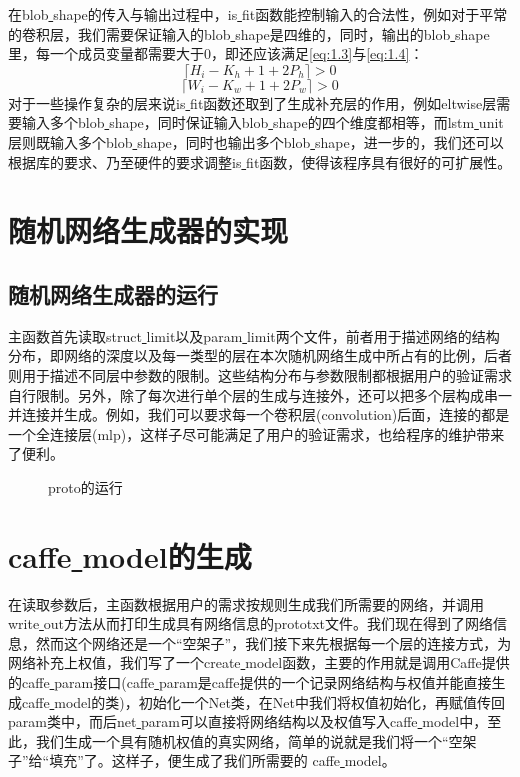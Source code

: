 在blob\underline{ }shape的传入与输出过程中，is\underline{ }fit函数能控制输入的合法性，例如对于平常的卷积层，我们需要保证输入的blob\underline{ }shape是四维的，同时，输出的blob\underline{ }shape里，每一个成员变量都需要大于0，即还应该满足\autoref{eq:1.3}与\autoref{eq:1.4}：
\begin{equation}\label{eq:1.3}
\lceil H_{i}-K_h+1+2P_{h}\rceil >0
\end{equation}
\begin{equation}\label{eq:1.4}
\lceil W_{i}-K_w+1+2P_{w}\rceil >0
\end{equation}
对于一些操作复杂的层来说is\underline{ }fit函数还取到了生成补充层的作用，例如eltwise层需要输入多个blob\underline{ }shape，同时保证输入blob\underline{ }shape的四个维度都相等，而lstm\underline{ }unit层则既输入多个blob\underline{ }shape，同时也输出多个blob\underline{ }shape，进一步的，我们还可以根据库的要求、乃至硬件的要求调整is\underline{ }fit函数，使得该程序具有很好的可扩展性。
\section{随机网络生成器的实现}
\subsection{随机网络生成器的运行}
主函数首先读取struct\underline{ }limit以及param\underline{ }limit两个文件，前者用于描述网络的结构分布，即网络的深度以及每一类型的层在本次随机网络生成中所占有的比例，后者则用于描述不同层中参数的限制。这些结构分布与参数限制都根据用户的验证需求自行限制。另外，除了每次进行单个层的生成与连接外，还可以把多个层构成串一并连接并生成。例如，我们可以要求每一个卷积层(convolution)后面，连接的都是一个全连接层(mlp)，这样子尽可能满足了用户的验证需求，也给程序的维护带来了便利。

\begin{figure}[!htbp]
\centering 
{}
\caption{proto的运行}
\label{fig:limit}
\end{figure}
\section{caffe\underline{ }model的生成}

在读取参数后，主函数根据用户的需求按规则生成我们所需要的网络，并调用write\underline{ }out方法从而打印生成具有网络信息的prototxt文件。我们现在得到了网络信息，然而这个网络还是一个“空架子”，我们接下来先根据每一个层的连接方式，为网络补充上权值，我们写了一个create\underline{ }model函数，主要的作用就是调用Caffe提供的caffe\underline{ }param接口(caffe\underline{ }param是caffe提供的一个记录网络结构与权值并能直接生成caffe\underline{ }model的类)，初始化一个Net类，在Net中我们将权值初始化，再赋值传回param类中，而后net\underline{ }param可以直接将网络结构以及权值写入caffe\underline{ }model中，至此，我们生成一个具有随机权值的真实网络，简单的说就是我们将一个“空架子”给“填充”了。这样子，便生成了我们所需要的 caffe\underline{ }model。

